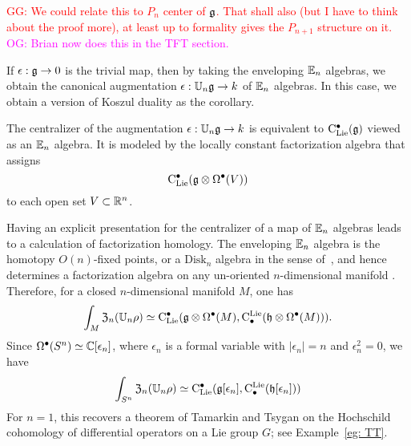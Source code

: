 \documentclass[11pt]{amsart}
\numberwithin{equation}{section}
\def\owen{\textcolor{magenta}{OG: }\textcolor{magenta}}
\def\greg{\textcolor{red}{GG: }\textcolor{red}}
\begin{document}
\greg{We could relate this to $P_n$ center of $\mathfrak g$. That shall also (but I have to think about the proof more), 
at least up to formality gives the $P_{n+1}$ structure on it. }\owen{Brian now does this in the TFT section.}

If $\epsilon: \mathfrak g \to 0$ is the trivial map, then by taking the enveloping $\mathbb E_n$ algebras, we obtain the canonical augmentation $\epsilon: \mathbb U_n \mathfrak g \to k$ of $\mathbb E_n$ algebras.
In this case, we obtain a version of Koszul duality as the corollary.

\begin{cor}
\label{thm: koszul duality}
The centralizer of the augmentation $\epsilon: \mathbb U_n \mathfrak g \to k$ is equivalent to ${\rm C}_{\rm Lie}^\bullet(\mathfrak g)$ viewed as an $\mathbb E_n$ algebra. It is modeled by the locally constant factorization algebra that assigns
\[
{\rm C}_{\rm Lie}^\bullet(\mathfrak g \otimes \Omega^\bullet(V))
\]
to each open set $V \subset \mathbb R^n$.
\end{cor}
%

Having an explicit presentation for the centralizer of a map of $\mathbb E_n$ algebras leads to a calculation of factorization homology.
The enveloping $\mathbb E_n$ algebra is the homotopy $O(n)$-fixed points, or a $\mathrm{Disk}_n$ algebra in the sense of~\cite{AF},
and hence determines a factorization algebra on any un-oriented $n$-dimensional manifold \cite{Knudsen}.
Therefore, for a closed $n$-dimensional manifold $M$, one has
\[
\int_M {\frak Z}_n(\mathbb U_n \rho) \simeq {\rm C}_{\rm Lie}^\bullet(\mathfrak g \otimes \Omega^\bullet(M), {\rm C}^{\rm Lie}_\bullet( \mathfrak h \otimes \Omega^\bullet(M))).
\]
Since $\Omega^\bullet(S^n) \simeq \mathbb C[\epsilon_n]$, where $\epsilon_n$ is a formal variable with $|\epsilon_n| = n$ and $\epsilon_n^2 = 0$, we have
\[
\int_{S^n} {\frak Z}_n(\mathbb U_n \rho) \simeq {\rm C}_{\rm Lie}^\bullet(\mathfrak g[\epsilon_n], {\rm C}^{\rm Lie}_\bullet( \mathfrak h[\epsilon_n]))
\]
For $n=1$, this recovers a theorem of Tamarkin and Tsygan \cite{TT} on the Hochschild cohomology of differential operators on a Lie group $G$;
see Example~\ref{eg: TT}. 
\end{document}

